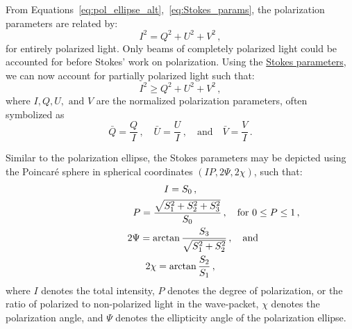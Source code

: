 
From Equations~\ref{eq:pol_ellipse_alt},~\ref{eq:Stokes_params}, the polarization parameters are related by:
\begin{equation}
    {I}^{2} = {Q}^{2} + {U}^{2} + {V}^{2}\,,
\end{equation}
for entirely polarized light. Only beams of completely polarized light could be accounted for before Stokes' work on polarization. Using the \hyperref[eq:Stokes_params]{Stokes parameters}, we can now account for partially polarized light such that:
\begin{equation}
    I^{2} \geq  Q^{2} + U^{2} + V^{2}\,,
\end{equation}
where $I, Q, U, \text{ and } V$ are the normalized polarization parameters, often symbolized as
\begin{equation}
    \bar{Q} = \frac{Q}{I}\,,\quad \bar{U} = \frac{U}{I}\,,\quad \text{and}\quad \bar{V} = \frac{V}{I}\,.\label{eq:Stokes_norm}
\end{equation}

Similar to the polarization ellipse, the Stokes parameters may be depicted using the Poincar{\'e} sphere in spherical coordinates $(IP, 2 \Psi, 2 \chi)$, such that:
\begin{equation}
    \begin{gathered}
        I = S_{0}\,,\\
        P = \frac{\sqrt{S_{1}^2 + S_{2}^2 + S_{3}^2}}{S_{0}}\,,\rlap{\quad for $0 \leq P \leq 1$\,,}\\
        2 \Psi = \arctan \frac{S_{3}}{\sqrt{S_{1}^{2} + S_{2}^{2}}}\,,\rlap{\quad and}\\
        2 \chi = \arctan \frac{S_{2}}{S_{1}}\,,
    \end{gathered}\label{eq:poincare_coords}
\end{equation}
where $I$ denotes the total intensity, $P$ denotes the degree of polarization, or the ratio of polarized to non-polarized light in the wave-packet, $\chi$ denotes the polarization angle, and $\Psi$ denotes the ellipticity angle of the polarization ellipse.

